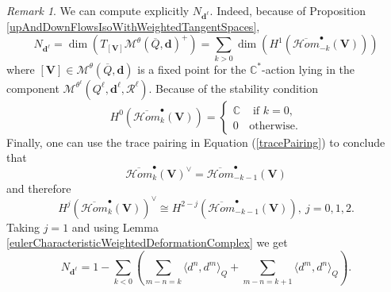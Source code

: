 \documentclass{amsart}
\theoremstyle{plain}
\numberwithin{equation}{section}
\theoremstyle{definition}
\theoremstyle{remark}
\newtheorem{remark}[theorem]{Remark}
\begin{document}
	\begin{remark}
	 We can compute explicitly $N_{\mathbf{d}^\ell}$. Indeed, because of Proposition \ref{upAndDownFlowsIsoWithWeightedTangentSpaces}, 
$$
N_{\mathbf{d}^\ell}=\dim(T_{[\mathbf{V}]}\mathcal{M}^{\theta}(\overline{Q},\mathbf{d})^+)=\sum_{k> 0}\dim(H^1(\overline{\mathcal{H}om}_{-k}^\bullet(\mathbf{V})))
$$
where $[\mathbf{V}]\in \mathcal{M}^{\theta}(\overline{Q},\mathbf{d})$ is a fixed point for the $\mathbb{C}^*$-action lying in the component $\mathcal{M}^{\theta^\ell}(Q^\ell,\mathbf{d}^\ell,\mathcal{R}^\ell)$. 
Because of the stability condition 
$$
H^0(\overline{\mathcal{H}om}_{k}^\bullet(\mathbf{V}))=\begin{cases}
	\mathbb{C} & \text{ if }k=0,\\
	0 & \text{otherwise}. 
\end{cases}
$$
Finally, one can use the trace pairing in Equation (\ref{tracePairing}) to conclude that 
$$
\overline{\mathcal{H}om}_{k}^\bullet(\mathbf{V})^\vee = \overline{\mathcal{H}om}_{-k-1}^\bullet(\mathbf{V})
$$
and therefore 
\begin{equation}\label{dualityWeightedCohomologyGroups}
H^j(\overline{\mathcal{H}om}_{k}^\bullet(\mathbf{V}))^\vee\cong H^{2-j}(\overline{\mathcal{H}om}_{-k-1}^\bullet(\mathbf{V})), \ j=0,1,2.
\end{equation}
Taking $j=1$ and using Lemma \ref{eulerCharacteristicWeightedDeformationComplex} we get
$$
N_{\mathbf{d}^\ell}=1-\sum_{k<0}\left(\sum_{m-n=k}\langle d^n,d^m\rangle_Q+\sum_{m-n=k+1}\langle d^m,d^n\rangle_Q\right).
$$
	\end{remark}
\end{document}
